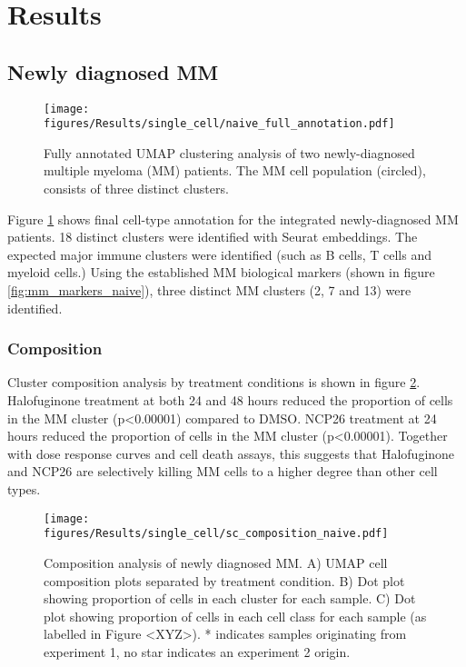 



\clearpage
\section{Results}

\subsection{Newly diagnosed MM}


\begin{figure}[hpt]
\centering
\texttt{[image: figures/Results/single\_cell/naive\_full\_annotation.pdf]}
\caption[Newly-diagnosed MM scRNA-seq full annotation]{Fully annotated UMAP clustering analysis of two newly-diagnosed multiple myeloma (MM) patients.
The MM cell population (circled), consists of three distinct clusters.}
\label{fig:full_anno_naive}
\end{figure}

Figure \ref{fig:full_anno_naive} shows final cell-type annotation for the integrated newly-diagnosed MM patients.
18 distinct clusters were identified with Seurat embeddings.
The expected major immune clusters were identified (such as B cells, T cells and myeloid cells.)
Using the established MM biological markers (shown in figure \ref{fig:mm_markers_naive}), three distinct MM clusters (2, 7 and 13) were identified.

\subsubsection{Composition}
Cluster composition analysis by treatment conditions is shown in figure \ref{fig:composition_naive}.
Halofuginone treatment at both 24 and 48 hours reduced the proportion of cells in the MM cluster (p<0.00001) compared to DMSO.
NCP26 treatment at 24 hours reduced the proportion of cells in the MM cluster (p<0.00001).
Together with dose response curves and cell death assays, this suggests that Halofuginone and NCP26 are selectively killing MM cells to a higher degree than other cell types.

\begin{figure}[htb]
\centering
\texttt{[image: figures/Results/single\_cell/sc\_composition\_naive.pdf]}
\caption[scRNA-seq composition analysis- newly diagnosed MM]{Composition analysis of newly diagnosed MM.
    A) UMAP cell composition plots separated by treatment condition.
    B) Dot plot showing proportion of cells in each cluster for each sample.
    C) Dot plot showing proportion of cells in each cell class for each sample (as labelled in Figure <XYZ>).
    * indicates samples originating from experiment 1, no star indicates an experiment 2 origin.}
\label{fig:composition_naive}
\end{figure}

